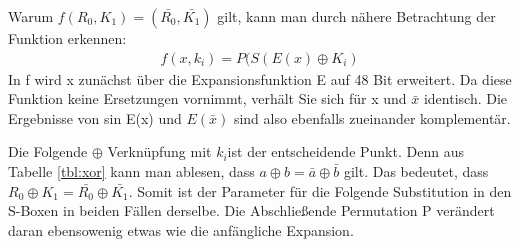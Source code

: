 \documentclass[10pt,a4paper,parskip]{scrartcl}
\begin{document}
Warum $f(R_{0},K_{1})=(\bar{R_{0}},\bar{K_{1}})$ gilt, kann man durch nähere Betrachtung der Funktion erkennen:
\begin{align*}
f(x,k_{i})=P(S(E(x)\oplus K_{i})
\end{align*}
In f wird x zunächst über die Expansionsfunktion E auf 48 Bit erweitert. Da diese Funktion keine Ersetzungen vornimmt, verhält Sie sich für x und $\bar{x}$ identisch. Die Ergebnisse von sin E(x) und $E(\bar{x})$ sind also ebenfalls zueinander komplementär.

Die Folgende $\oplus$ Verknüpfung mit $k_{i} $ist der entscheidende Punkt. Denn aus Tabelle \ref{tbl:xor} kann man ablesen, dass $a \oplus b=\bar{a} \oplus \bar{b}$ gilt. Das bedeutet, dass $R_{0} \oplus K_{1}=\bar{R_{0}} \oplus \bar{K_{1}}$. Somit ist der Parameter für die Folgende Substitution in den S-Boxen in beiden Fällen derselbe. Die Abschließende Permutation P verändert daran ebensowenig etwas wie die anfängliche Expansion. 
\end{document}
